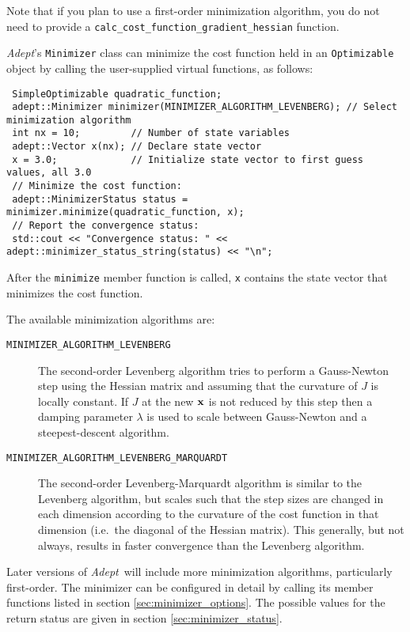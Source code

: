 \documentclass[a4,oneside]{book}
\def\codesize{\small}
\def\Adept{\emph{Adept}}
\def\code#1{{\codesize\texttt{#1}}}
\def\citem#1{\item[{\codesize\texttt{#1}}]}
\begin{document}
Note that if you plan to use a first-order minimization algorithm, you
do not need to provide a
\code{calc\_cost\_function\_gradient\_hessian} function.

\Adept's \code{Minimizer} class can minimize the cost function
held in an \code{Optimizable} object by calling the user-supplied
virtual functions, as follows:
\begin{lstlisting}
 SimpleOptimizable quadratic_function;
 adept::Minimizer minimizer(MINIMIZER_ALGORITHM_LEVENBERG); // Select minimization algorithm
 int nx = 10;         // Number of state variables
 adept::Vector x(nx); // Declare state vector
 x = 3.0;             // Initialize state vector to first guess values, all 3.0
 // Minimize the cost function:
 adept::MinimizerStatus status = minimizer.minimize(quadratic_function, x);
 // Report the convergence status:
 std::cout << "Convergence status: " << adept::minimizer_status_string(status) << "\n";
\end{lstlisting}
%
After the \code{minimize} member function is called, \code{x} contains
the state vector that minimizes the cost function.

The available minimization algorithms are:
\begin{description}
\citem{MINIMIZER\_ALGORITHM\_LEVENBERG} The second-order Levenberg
algorithm tries to perform a Gauss-Newton step using the Hessian
matrix and assuming that the curvature of $J$ is locally constant. If
$J$ at the new ${\bf x}$ is not reduced by this step then a damping
parameter $\lambda$ is used to scale between Gauss-Newton and a
steepest-descent algorithm.
%
\citem{MINIMIZER\_ALGORITHM\_LEVENBERG\_MARQUARDT} The second-order
Levenberg-Marquardt algorithm is similar to the Levenberg algorithm,
but scales such that the step sizes are changed in each dimension
according to the curvature of the cost function in that dimension
(i.e.\ the diagonal of the Hessian matrix). This generally, but not
always, results in faster convergence than the Levenberg algorithm.
\end{description}
Later versions of \Adept\ will include more minimization algorithms,
particularly first-order. The minimizer can be configured in detail by
calling its member functions listed in section
\ref{sec:minimizer_options}.  The possible values for the return
status are given in section \ref{sec:minimizer_status}.
\end{document}
